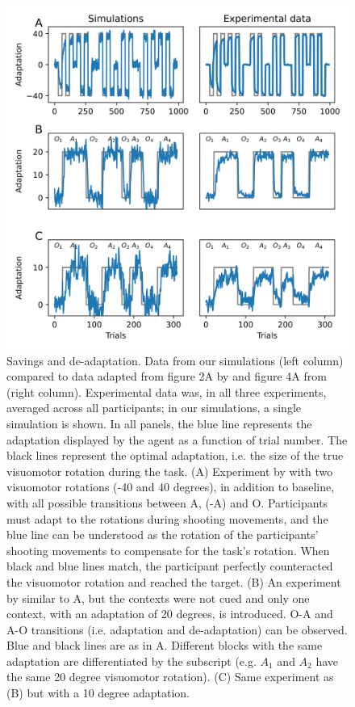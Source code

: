 \documentclass[a4paper,doc,floatsintext,natbib]{apa6}%
\begin{document}
\begin{figure}
\centering
\includegraphics{./figures/figure_2.png}
\caption{Savings and de-adaptation. Data from our simulations (left column) compared to data adapted from figure 2A by \cite{Kim_Neural_2015} and figure 4A from \cite{Oh_Minimizing_2019} (right column). Experimental data was, in all three experiments, averaged across all participants; in our simulations, a single simulation is shown. In all panels, the blue line represents the adaptation displayed by the agent as a function of trial number. The black lines represent the optimal adaptation, i.e. the size of the true visuomotor rotation during the task. (A) Experiment by \cite{Kim_Neural_2015} with two visuomotor rotations (-40 and 40 degrees), in addition to baseline, with all possible transitions between A, (-A) and O. Participants must adapt to the rotations during shooting movements, and the blue line can be understood as the rotation of the participants' shooting movements to compensate for the task's rotation. When black and blue lines match, the participant perfectly counteracted the visuomotor rotation and reached the target. (B) An experiment by \cite{Oh_Minimizing_2019} similar to A, but the contexts were not cued and only one context, with an adaptation of 20 degrees, is introduced. O-A and A-O transitions (i.e. adaptation and de-adaptation) can be observed. Blue and black lines are as in A. Different blocks with the same adaptation are differentiated by the subscript (e.g. $A_1$ and $A_2$ have the same 20 degree visuomotor rotation). (C) Same experiment as (B) but with a 10 degree adaptation.} \label{fig:oh-2019}
\end{figure}
\end{document}
